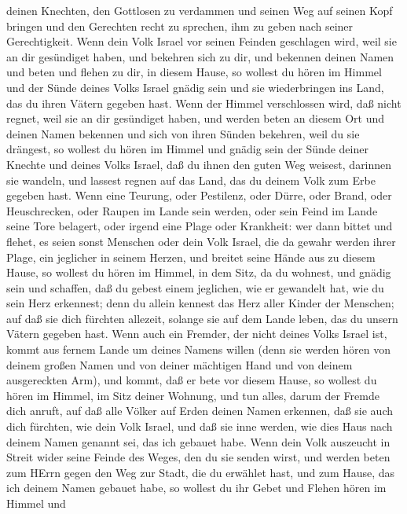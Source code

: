 deinen Knechten, den Gottlosen zu verdammen und seinen Weg auf seinen
Kopf bringen und den Gerechten recht zu sprechen, ihm zu geben nach
seiner Gerechtigkeit.  Wenn dein Volk Israel vor seinen
Feinden geschlagen wird, weil sie an dir gesündiget haben, und bekehren
sich zu dir, und bekennen deinen Namen und beten und flehen zu dir, in
diesem Hause,  so wollest du hören im Himmel und der Sünde
deines Volks Israel gnädig sein und sie wiederbringen ins Land, das du
ihren Vätern gegeben hast.  Wenn der Himmel verschlossen
wird, daß nicht regnet, weil sie an dir gesündiget haben, und werden
beten an diesem Ort und deinen Namen bekennen und sich von ihren Sünden
bekehren, weil du sie drängest,  so wollest du hören im
Himmel und gnädig sein der Sünde deiner Knechte und deines Volks Israel,
daß du ihnen den guten Weg weisest, darinnen sie wandeln, und lassest
regnen auf das Land, das du deinem Volk zum Erbe gegeben hast.
 Wenn eine Teurung, oder Pestilenz, oder Dürre, oder Brand,
oder Heuschrecken, oder Raupen im Lande sein werden, oder sein Feind im
Lande seine Tore belagert, oder irgend eine Plage oder Krankheit:
 wer dann bittet und flehet, es seien sonst Menschen oder
dein Volk Israel, die da gewahr werden ihrer Plage, ein jeglicher in
seinem Herzen, und breitet seine Hände aus zu diesem Hause,
 so wollest du hören im Himmel, in dem Sitz, da du wohnest,
und gnädig sein und schaffen, daß du gebest einem jeglichen, wie er
gewandelt hat, wie du sein Herz erkennest; denn du allein kennest das
Herz aller Kinder der Menschen;  auf daß sie dich fürchten
allezeit, solange sie auf dem Lande leben, das du unsern Vätern gegeben
hast.  Wenn auch ein Fremder, der nicht deines Volks Israel
ist, kommt aus fernem Lande um deines Namens willen  (denn
sie werden hören von deinem großen Namen und von deiner mächtigen Hand
und von deinem ausgereckten Arm), und kommt, daß er bete vor diesem
Hause,  so wollest du hören im Himmel, im Sitz deiner
Wohnung, und tun alles, darum der Fremde dich anruft, auf daß alle
Völker auf Erden deinen Namen erkennen, daß sie auch dich fürchten, wie
dein Volk Israel, und daß sie inne werden, wie dies Haus nach deinem
Namen genannt sei, das ich gebauet habe.  Wenn dein Volk
auszeucht in Streit wider seine Feinde des Weges, den du sie senden
wirst, und werden beten zum HErrn gegen den Weg zur Stadt, die du
erwählet hast, und zum Hause, das ich deinem Namen gebauet habe,
 so wollest du ihr Gebet und Flehen hören im Himmel und
